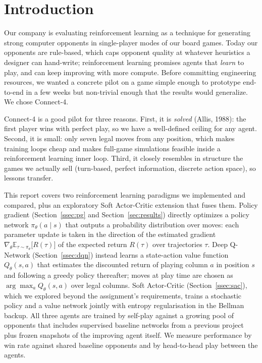 \documentclass[11pt]{article}
\begin{document}
\section{Introduction}
\label{sec:intro}

Our company is evaluating reinforcement learning as a technique for
generating strong computer opponents in single-player modes of our board
games. Today our opponents are rule-based, which caps opponent quality at
whatever heuristics a designer can hand-write; reinforcement learning
promises agents that \emph{learn} to play, and can keep improving with more
compute. Before committing engineering resources, we wanted a concrete pilot
on a game simple enough to prototype end-to-end in a few weeks but
non-trivial enough that the results would generalize. We chose Connect-4.

Connect-4 is a good pilot for three reasons. First, it is \emph{solved} (Allis,
1988): the first player wins with perfect play, so we have a well-defined
ceiling for any agent. Second, it is small: only seven legal moves from any
position, which makes training loops cheap and makes full-game simulations
feasible inside a reinforcement learning inner loop. Third, it closely
resembles in structure the games we actually sell (turn-based, perfect
information, discrete action space), so lessons transfer.

This report covers two reinforcement learning paradigms we implemented and
compared, plus an exploratory Soft Actor-Critic extension that fuses them.
Policy gradient (Section~\ref{ssec:pg} and
Section~\ref{sec:results}) directly optimizes a policy network
$\pi_\theta(a \mid s)$ that outputs a probability distribution over moves:
each parameter update is taken in the direction of the estimated gradient
$\nabla_\theta \mathbb{E}_{\tau \sim \pi_\theta}\!\bigl[R(\tau)\bigr]$ of the
expected return $R(\tau)$ over trajectories $\tau$. Deep Q-Network
(Section~\ref{ssec:dqn}) instead learns a state-action value function
$Q_\theta(s, a)$ that estimates the discounted return of playing column $a$
in position $s$ and following a greedy policy thereafter; moves at play time
are chosen as $\arg\max_a Q_\theta(s, a)$ over legal columns. Soft
Actor-Critic (Section~\ref{ssec:sac}), which we explored beyond the
assignment's requirements, trains a stochastic policy and a value
network jointly with entropy regularisation in the Bellman backup.
All three agents are
trained by self-play against a growing pool of opponents that includes
supervised baseline networks from a previous project plus frozen snapshots
of the improving agent itself. We measure performance by win rate against
shared baseline opponents and by head-to-head play between the agents.
\end{document}
